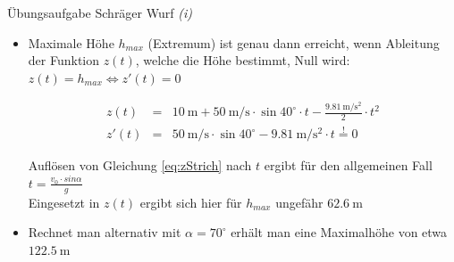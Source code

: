\documentclass{beamer}
\begin{document}
\begin{frame}{Übungsaufgabe Schräger Wurf \emph{(i)}}
    \begin{itemize}

    \item Maximale Höhe $h_{max}$ (Extremum) ist genau dann erreicht, wenn Ableitung 
    der Funktion $z (t)$, welche die Höhe bestimmt, Null wird: \\
    $z (t) = h_{max} \Leftrightarrow z' (t) = 0$

  \begin{eqnarray}
    z (t)  &=& \SI{10}{\meter} + \SI{50}{\meter\per\second} \cdot \sin 40^\circ \cdot t - 
        \frac{\SI{9.81}{\meter\per\square\second}}{2} \cdot t^2 \\
    z' (t) &=& \SI{50}{\meter\per\second} \cdot \sin 40^\circ - \SI{9.81}{\meter\per\square\second} \cdot t \stackrel{!}= 0
    \label{eq:zStrich}
  \end{eqnarray}

    Auflösen von Gleichung \ref{eq:zStrich} nach $t$ ergibt für den allgemeinen Fall 
    $t = \frac{v_0 \cdot sin \alpha}{g}$ \\
    Eingesetzt in $z (t)$ ergibt sich hier für $h_{max}$ ungefähr $\SI{62.6}{\meter}$
    
    \item Rechnet man alternativ mit $\alpha = 70^{\circ}$ erhält man eine Maximalhöhe von etwa $\SI{122.5}{\meter}$
    
    \end{itemize}
\end{frame}
\end{document}
